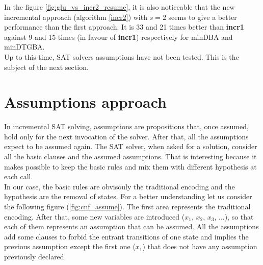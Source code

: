 \noindent In the figure \ref{fig:glu_vs_incr2_resume}, it is also noticeable that the new incremental
approach (algorithm \ref{incr2}) with $s = 2$ seems to give a better performance than the first approach.
It is 33 and 21 times better than \textbf{incr1} against 9 and 15 times (in favour of \textbf{incr1})
respectively for minDBA and minDTGBA.\\

\noindent Up to this time, SAT solvers assumptions have not been tested. This is the subject of the next
section.

\section{Assumptions approach}
In incremental SAT solving, assumptions are propositions that, once assumed, hold only for the next
invocation of the solver. After that, all the assumptions expect to be assumed again. The SAT solver, when
asked for a solution, consider all the basic clauses and the assumed assumptions. That is interesting
because it makes possible to keep the basic rules and mix them with different hypothesis at each call.\\

In our case, the basic rules are obvisouly the traditional encoding and the hypothesis are the removal
of states. For a better understanding let us consider the following figure (\ref{fig:cnf_assume}). The
first area represents the traditional encoding. After that, some new variables are introduced
($x_1$, $x_2$, $x_3$, ...), so that each of them represents an assumption that can be assumed.
All the assumptions add some clauses to forbid the entrant transitions of one state and implies the
previous assumption except the first one ($x_1$) that does not have any assumption previously declared.\\

